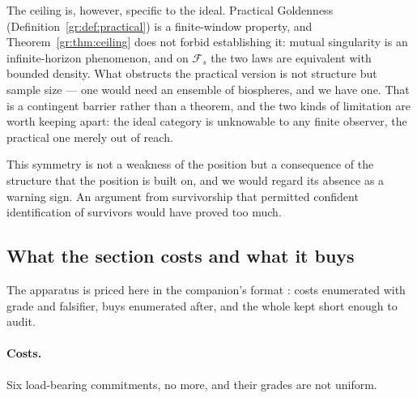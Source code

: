 \documentclass[11pt]{article}
\numberwithin{equation}{section}
\theoremstyle{plain}
\theoremstyle{definition}
\theoremstyle{remark}
\begin{document}
The ceiling is, however, specific to the ideal. Practical Goldenness
(Definition~\ref{gr:def:practical}) is a finite-window property, and
Theorem~\ref{gr:thm:ceiling} does not forbid establishing it: mutual
singularity is an infinite-horizon phenomenon, and on $\mathcal F_s$ the
two laws are equivalent with bounded density. What obstructs the
practical version is not structure but sample size --- one would need an
ensemble of biospheres, and we have one. That is a contingent barrier
rather than a theorem, and the two kinds of limitation are worth keeping
apart: the ideal category is unknowable to any finite observer, the
practical one merely out of reach.

This symmetry is not a weakness of the position but a consequence of the
structure that the position is built on, and we would regard its absence
as a warning sign. An argument from survivorship that permitted
confident identification of survivors would have proved too much.

\subsection{What the section costs and what it buys}
\label{gr:sub:ledger}

The apparatus is priced here in the companion's format
\cite{Ben26Optimal}: costs enumerated with grade and falsifier, buys
enumerated after, and the whole kept short enough to audit.

\paragraph{Costs.} Six load-bearing commitments, no more, and their
grades are not uniform.
\end{document}
